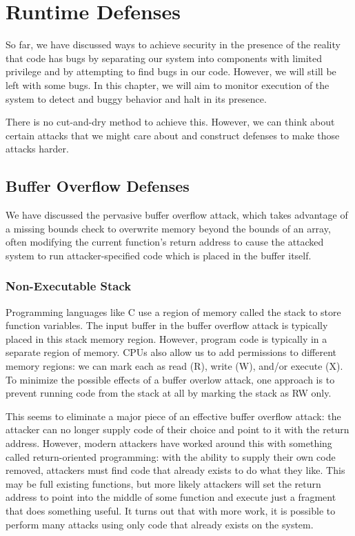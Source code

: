 \chapter{Runtime Defenses}
So far, we have discussed ways to achieve security in the presence of the reality that code has bugs by separating our system into components with limited privilege and by attempting to find bugs in our code. However, we will still be left with some bugs. In this chapter, we will aim to monitor execution of the system to detect and buggy behavior and halt in its presence.

There is no cut-and-dry method to achieve this. However, we can think about certain attacks that we might care about and construct defenses to make those attacks harder.

\section{Buffer Overflow Defenses}

We have discussed the pervasive buffer overflow attack, which takes advantage of a missing bounds check to overwrite memory beyond the bounds of an array, often modifying the current function's return address to cause the attacked system to run attacker-specified code which is placed in the buffer itself.

\subsection{Non-Executable Stack}
Programming languages like C use a region of memory called the stack to store function variables. The input buffer in the buffer overflow attack is typically placed in this stack memory region. However, program code is typically in a separate region of memory. CPUs also allow us to add permissions to different memory regions: we can mark each as read (R), write (W), and/or execute (X). To minimize the possible effects of a buffer overlow attack, one approach is to prevent running code from the stack at all by marking the stack as RW only.

This seems to eliminate a major piece of an effective buffer overflow attack: the attacker can no longer supply code of their choice and point to it with the return address. However, modern attackers have worked around this with something called return-oriented programming: with the ability to supply their own code removed, attackers must find code that already exists to do what they like. This may be full existing functions, but more likely attackers will set the return address to point into the middle of some function and execute just a fragment that does something useful. It turns out that with more work, it is possible to perform many attacks using only code that already exists on the system.

